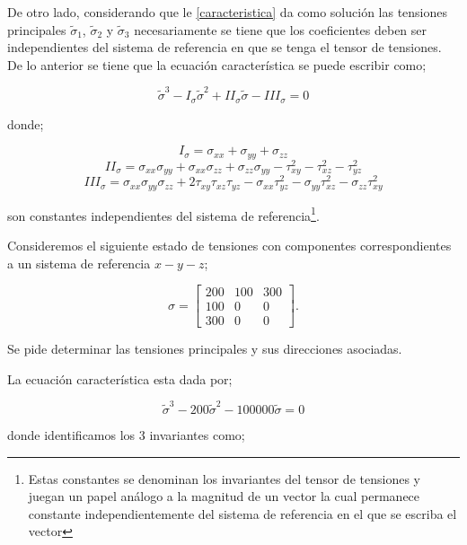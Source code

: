\documentclass[../notas medios.tex]{subfiles}
\begin{document}
De otro lado, considerando que le \cref{caracteristica} da como solución las tensiones principales ${{\tilde \sigma }_1}$, ${{\tilde \sigma }_2}$ y ${{\tilde \sigma }_3}$ necesariamente se tiene que los coeficientes deben ser independientes del sistema de referencia en que se tenga el tensor de tensiones. De lo anterior se tiene que la ecuación característica se puede escribir como;

\[{{\tilde \sigma }^3} - {I_\sigma }{{\tilde \sigma }^2} + I{I_\sigma }\tilde \sigma  - II{I_\sigma } = 0\]

donde;

\[{I_\sigma } = {\sigma _{xx}} + {\sigma _{yy}} + {\sigma _{zz}}\]
\[I{I_\sigma } = {\sigma _{xx}}{\sigma _{yy}} + {\sigma _{xx}}{\sigma _{zz}} + {\sigma _{zz}}{\sigma _{yy}} - \tau _{xy}^2 - \tau _{xz}^2 - \tau _{yz}^2\]
\[II{I_\sigma } = {\sigma _{xx}}{\sigma _{yy}}{\sigma _{zz}} + 2{\tau _{xy}}{\tau _{xz}}{\tau _{yz}} - {\sigma _{xx}}\tau _{yz}^2 - {\sigma _{yy}}\tau _{xz}^2 - {\sigma _{zz}}\tau _{xy}^2\]

son constantes independientes del sistema de referencia\footnote{Estas constantes se denominan los invariantes del tensor de tensiones y juegan un papel análogo a la magnitud de un vector la cual permanece constante independientemente del sistema de referencia en el que se escriba el vector}.

Consideremos el siguiente estado de tensiones con componentes correspondientes a un sistema de referencia $x-y-z$;

\[\sigma  = \left[ {\begin{array}{*{20}{c}}
{200}&{100}&{300}\\
{100}&0&0\\
{300}&0&0
\end{array}} \right].\]

Se pide determinar las tensiones principales y sus direcciones asociadas.

La ecuación característica esta dada por;

\[{{\tilde \sigma }^3} - 200{{\tilde \sigma }^2} - 100000\tilde \sigma  = 0\]

donde identificamos los 3 invariantes como;
\end{document}
